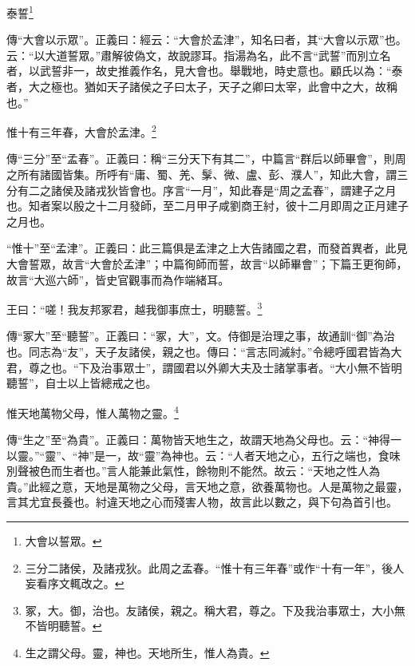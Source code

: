 泰誓\footnote{大會以誓眾。}

{\noindent\shu{}\fzkt 傳“大會以示眾”。正義曰：經云：“大會於孟津”，知名曰者，其“大會以示眾”也。云：“以大道誓眾。”肅解彼偽文，故說謬耳。指湯為名，此不言“武誓”而別立名者，以武誓非一，故史推義作名，見大會也。舉戰地，時史意也。顧氏以為：“泰者，大之極也。猶如天子諸侯之子曰太子，天子之卿曰太宰，此會中之大，故稱也。” \par}

惟十有三年春，大會於孟津。\footnote{三分二諸侯，及諸戎狄。此周之孟春。“惟十有三年春”或作“十有一年”，後人妄看序文輒改之。}

{\noindent\zhuan{}\fzbyks 傳“三分”至“孟春”。正義曰：稱“三分天下有其二”，中篇言“群后以師畢會”，則周之所有諸國皆集。所呼有“庸、蜀、羌、髳、微、盧、彭、濮人”，知此大會，謂三分有二之諸侯及諸戎狄皆會也。序言“一月”，知此春是“周之孟春”，謂建子之月也。知者案以殷之十二月發師，至二月甲子咸劉商王紂，彼十二月即周之正月建子之月也。 \par}

{\noindent\shu{}\fzkt “惟十”至“孟津”。正義曰：此三篇俱是孟津之上大告諸國之君，而發首異者，此見大會誓眾，故言“大會於孟津”；中篇徇師而誓，故言“以師畢會”；下篇王更徇師，故言“大巡六師”，皆史官觀事而為作端緒耳。 \par}

王曰：“嗟！我友邦冢君，越我御事庶士，明聽誓。\footnote{冢，大。御，治也。友諸侯，親之。稱大君，尊之。下及我治事眾士，大小無不皆明聽誓。}

{\noindent\zhuan{}\fzbyks 傳“冢大”至“聽誓”。正義曰：“冢，大”，文。侍御是治理之事，故通訓“御”為治也。同志為“友”，天子友諸侯，親之也。傳曰：“言志同滅紂。”令總呼國君皆為大君，尊之也。“下及治事眾士”，謂國君以外卿大夫及士諸掌事者。“大小無不皆明聽誓”，自士以上皆總戒之也。 \par}

惟天地萬物父母，惟人萬物之靈。\footnote{生之謂父母。靈，神也。天地所生，惟人為貴。}

{\noindent\zhuan{}\fzbyks 傳“生之”至“為貴”。正義曰：萬物皆天地生之，故謂天地為父母也。云：“神得一以靈。”“靈”、“神”是一，故“靈”為神也。云：“人者天地之心，五行之端也，食味別聲被色而生者也。”言人能兼此氣性，餘物則不能然。故云：“天地之性人為貴。”此經之意，天地是萬物之父母，言天地之意，欲養萬物也。人是萬物之最靈，言其尤宜長養也。紂違天地之心而殘害人物，故言此以數之，與下句為首引也。 \par}

